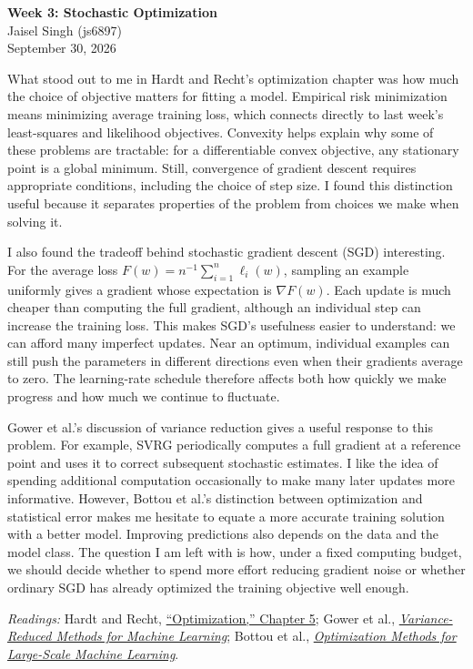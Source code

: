 \documentclass[12pt]{article}
\begin{document}
\begin{flushleft}
\textbf{Week 3: Stochastic Optimization} \\
Jaisel Singh (js6897) \\
September 30, 2026
\end{flushleft}

\vspace{0.1in}

What stood out to me in Hardt and Recht's optimization chapter was how much
the choice of objective matters for fitting a model. Empirical risk minimization
means minimizing average training loss, which connects directly to last week's
least-squares and likelihood objectives. Convexity helps explain why some of
these problems are tractable: for a differentiable convex objective, any
stationary point is a global minimum. Still, convergence of gradient descent
requires appropriate conditions, including the choice of step size. I found this
distinction useful because it separates properties of the problem from choices
we make when solving it.

I also found the tradeoff behind stochastic gradient descent (SGD) interesting.
For the average loss \mbox{$F(w)=n^{-1}\sum_{i=1}^{n}\ell_i(w)$}, sampling an
example uniformly gives a gradient whose expectation is $\nabla F(w)$. Each update is much cheaper
than computing the full gradient, although an individual step can increase the
training loss. This makes SGD's usefulness easier to understand: we can afford
many imperfect updates. Near an optimum, individual examples can still push
the parameters in different directions even when their gradients average to
zero. The learning-rate schedule therefore affects both how quickly we make
progress and how much we continue to fluctuate.

Gower et al.'s discussion of variance reduction gives a useful response to this
problem. For example, SVRG periodically computes a full gradient at a reference
point and uses it to correct subsequent stochastic estimates. I like the idea
of spending additional computation occasionally to make many later updates more
informative. However, Bottou et al.'s distinction between optimization and
statistical error makes me hesitate to equate a more accurate training solution
with a better model. Improving predictions also depends on the data and the
model class. The question I am left with is how, under a fixed computing budget,
we should decide whether to spend more effort reducing gradient noise or whether
ordinary SGD has already optimized the training objective well enough.

\vspace{0.05in}
{\footnotesize
\textit{Readings:} Hardt and Recht, \href{https://mlstory.org/optimization.html}{``Optimization,'' Chapter 5};
Gower et al., \href{https://arxiv.org/abs/2010.00892}{\emph{Variance-Reduced Methods for Machine Learning}};
Bottou et al., \href{https://arxiv.org/abs/1606.04838}{\emph{Optimization Methods for Large-Scale Machine Learning}}.
\par}
\end{document}

